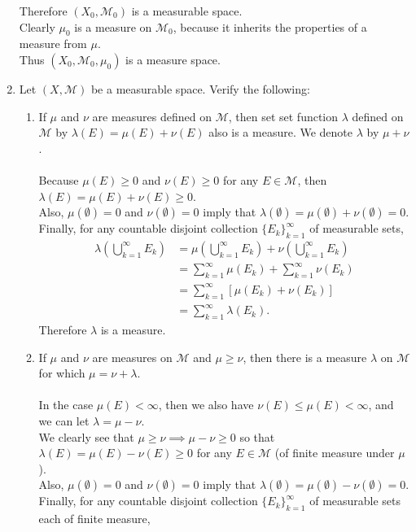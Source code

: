 \begin{enumerate}
	Therefore $(X_0,\mathcal{M}_0)$ is a measurable space.\\
	Clearly $\mu_0$ is a measure on $\mathcal{M}_0$, because it inherits the properties of a measure from $\mu$.\\
	Thus $(X_0,\mathcal{M}_0,\mu_0)$ is a measure space.
	\item Let $(X,\mathcal{M})$ be a measurable space. Verify the following:
	\begin{enumerate}[label=(\roman*),align=left]  
		\item If $\mu$ and $\nu$ are measures defined on $\mathcal{M}$, then set set function $\lambda$ defined on $\mathcal{M}$ by $\lambda(E)=\mu(E)+\nu(E)$ also is a measure. We denote $\lambda$ by $\mu+\nu$.\\
		\\Because $\mu(E)\ge 0$ and $\nu(E)\ge 0$ for any $E\in\mathcal{M}$, then $\lambda(E)=\mu(E)+\nu(E)\ge 0$.
		\\Also, $\mu(\emptyset)= 0$ and $\nu(\emptyset)= 0$ imply that $\lambda(\emptyset)=\mu(\emptyset)+\nu(\emptyset)= 0$.
		\\Finally, for any countable disjoint collection $\{E_k\}_{k=1}^\infty$ of measurable sets,
		\begin{align*}
			\lambda\left(\bigcup_{k=1}^\infty E_k\right)&=\mu\left(\bigcup_{k=1}^\infty E_k\right)+\nu\left(\bigcup_{k=1}^\infty E_k\right)\\
			&=\sum_{k=1}^\infty\mu(E_k)+\sum_{k=1}^\infty\nu(E_k)\\
			&=\sum_{k=1}^\infty[\mu(E_k)+\nu(E_k)]\\
			&=\sum_{k=1}^\infty\lambda(E_k).
		\end{align*}
		Therefore $\lambda$ is a measure.
		\item If $\mu$ and $\nu$ are measures on $\mathcal{M}$ and $\mu\ge\nu$, then there is a measure $\lambda$ on $\mathcal{M}$ for which $\mu=\nu+\lambda$.\\
		\\In the case $\mu(E)<\infty$, then we also have $\nu(E)\le\mu(E)<\infty$, and we can let $\lambda = \mu-\nu$.
		\\We clearly see that $\mu\ge\nu\implies\mu-\nu\ge0$ so that $\lambda(E)=\mu(E)-\nu(E)\ge 0$ for any $E\in\mathcal{M}$ (of finite measure under $\mu$).
		\\Also, $\mu(\emptyset)= 0$ and $\nu(\emptyset)= 0$ imply that $\lambda(\emptyset)=\mu(\emptyset)-\nu(\emptyset)= 0$.
		\\Finally, for any countable disjoint collection $\{E_k\}_{k=1}^\infty$ of measurable sets each of finite measure,

\end{enumerate}
\end{enumerate}

